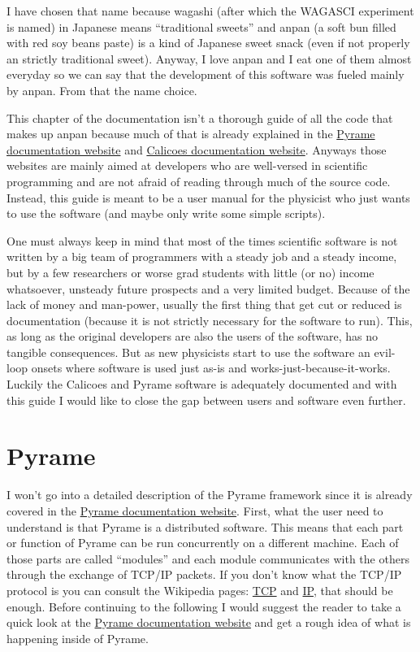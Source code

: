 I have chosen that name because wagashi (after which the WAGASCI
experiment is named) in Japanese means ``traditional sweets'' and
anpan (a soft bun filled with red soy beans paste) is a kind of
Japanese sweet snack (even if not properly an strictly traditional
sweet). Anyway, I love anpan and I eat one of them almost everyday so
we can say that the development of this software was fueled mainly by
anpan. From that the name choice.

This chapter of the documentation isn't a thorough guide of all the
code that makes up anpan because much of that is already explained in
the \href{http://llr.in2p3.fr/sites/pyrame/documentation/}{Pyrame
  documentation website} and
\href{http://llr.in2p3.fr/sites/pyrame/calicoes/documentation/}{Calicoes
  documentation website}. Anyways those websites are mainly aimed at
developers who are well-versed in scientific programming and are not
afraid of reading through much of the source code. Instead, this guide
is meant to be a user manual for the physicist who just wants to
use the software (and maybe only write some simple scripts).

One must always keep in mind that most of the times scientific
software is not written by a big team of programmers with a steady job
and a steady income, but by a few researchers or worse grad students
with little (or no) income whatsoever, unsteady future prospects and a
very limited budget. Because of the lack of money and man-power,
usually the first thing that get cut or reduced is documentation
(because it is not strictly necessary for the software to run). This,
as long as the original developers are also the users of the software,
has no tangible consequences. But as new physicists start to use the
software an evil-loop onsets where software is used just as-is and
works-just-because-it-works. Luckily the Calicoes and Pyrame software is
adequately documented and with this guide I would like to close the
gap between users and software even further.

\section{Pyrame}
I won't go into a detailed description of the Pyrame framework since
it is already covered in the
\href{http://llr.in2p3.fr/sites/pyrame/documentation/}{Pyrame
  documentation website}. First, what the user need to understand is
that Pyrame is a distributed software. This means that each part or
function of Pyrame can be run concurrently on a different
machine. Each of those parts are called ``modules'' and each module
communicates with the others through the exchange of TCP/IP
packets. If you don't know what the TCP/IP protocol is you can consult
the Wikipedia pages:
\href{https://en.wikipedia.org/wiki/Transmission_Control_Protocol}{TCP}
and \href{https://en.wikipedia.org/wiki/IPv4}{IP}, that should be
enough. Before continuing to the following I would suggest the reader
to take a quick look at the
\href{http://llr.in2p3.fr/sites/pyrame/documentation/}{Pyrame
  documentation website} and get a rough idea of what is happening
inside of Pyrame.

